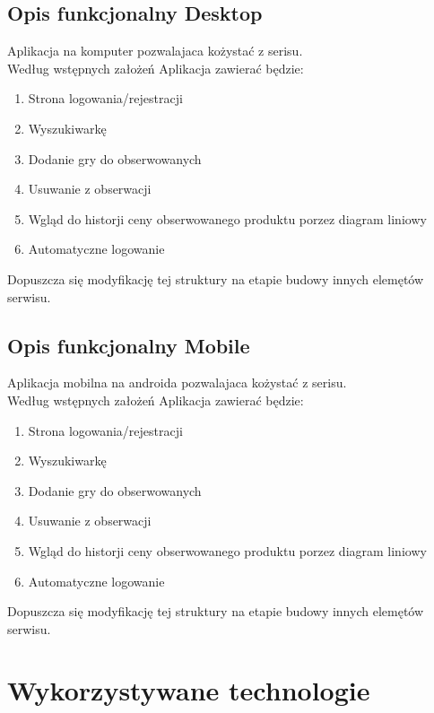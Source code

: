 \documentclass{article}
\begin{document}
    \subsection{Opis funkcjonalny Desktop}
        Aplikacja na komputer pozwalajaca kożystać z serisu.\\
        Według wstępnych założeń Aplikacja zawierać będzie:
        \begin{enumerate}
            \item Strona logowania/rejestracji
            \item Wyszukiwarkę
            \item Dodanie gry do obserwowanych
            \item Usuwanie z obserwacji
            \item Wgląd do historji ceny obserwowanego produktu porzez diagram liniowy
            \item Automatyczne logowanie
        \end{enumerate}
        Dopuszcza się modyfikację tej struktury na etapie budowy innych elemętów serwisu.
        
    \subsection{Opis funkcjonalny Mobile}
        Aplikacja mobilna na androida pozwalajaca kożystać z serisu.\\
        Według wstępnych założeń Aplikacja zawierać będzie:
            \begin{enumerate}
            \item Strona logowania/rejestracji
            \item Wyszukiwarkę
            \item Dodanie gry do obserwowanych
            \item Usuwanie z obserwacji
            \item Wgląd do historji ceny obserwowanego produktu porzez diagram liniowy
            \item Automatyczne logowanie
        \end{enumerate}
        Dopuszcza się modyfikację tej struktury na etapie budowy innych elemętów serwisu.

\section{Wykorzystywane technologie}
\end{document}
